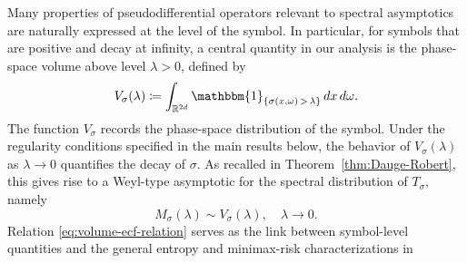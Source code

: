 \documentclass[a4paper,12pt]{article}
\newcommand{\diff}{\mathop{}\!d}
\newcommand{\symbolnot}{\sigma}
\begin{document}
Many properties of pseudodifferential operators relevant to spectral asymptotics are naturally expressed at the level of the symbol. In particular, for symbols that are positive and decay at infinity, 
a central quantity in our analysis is the phase-space volume above level 
$\lambda>0$, defined by
\begin{equation}\label{eq:definition-volume-function}
    V_{\symbolnot}(\lambda) 
    \coloneqq \int_{\mathbb{R}^{2d}} \mathbbm{1}_{\{\symbolnot(x, \omega)\, > \, \lambda\}} \diff  x\diff \omega.
\end{equation}
The function $V_{\symbolnot}$ records the phase-space distribution of the symbol.
Under the regularity conditions specified in the main results below, the behavior of $V_{\symbolnot}(\lambda)$ as $\lambda \rightarrow 0$ quantifies the decay of $\sigma$. 
As recalled in Theorem~\ref{thm:Dauge-Robert}, this gives rise to a Weyl-type asymptotic for the spectral distribution of $T_{\symbolnot}$, namely %
\begin{equation}\label{eq:volume-ecf-relation}
    M_{\symbolnot}(\lambda)  \sim V_{\symbolnot}(\lambda), \quad 
    \lambda \rightarrow 0. 
\end{equation}
Relation \eqref{eq:volume-ecf-relation} serves as the link between symbol-level quantities and the general %
entropy and minimax-risk characterizations in 
\end{document}
